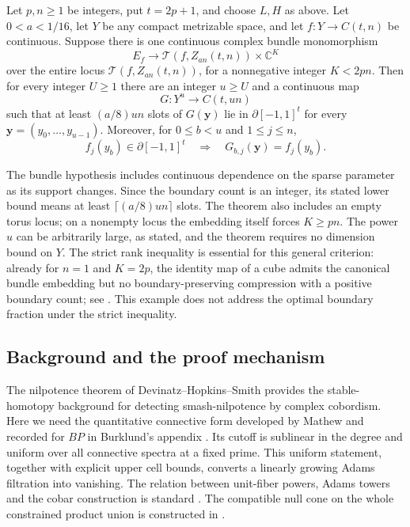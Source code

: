 \begin{theorem}
\label{thm:torus-compression}
Let $p,n\ge1$ be integers, put $t=2p+1$, and choose $L,H$ as above.
Let $0<a<1/16$, let $Y$ be any compact metrizable space, and let
$f:Y\to C(t,n)$ be continuous.  Suppose there is one continuous
complex bundle monomorphism
\[
 E_f\longrightarrow\mathcal T(f,Z_{an}(t,n))\times\mathbb C^K
\]
over the entire locus $\mathcal T(f,Z_{an}(t,n))$, for a nonnegative
integer $K<2pn$.  Then for every integer $U\ge1$ there are an integer
$u\ge U$ and a continuous map
\[
 G:Y^u\longrightarrow C(t,un)
\]
such that at least $(a/8)un$ slots of $G(\mathbf y)$ lie in
$\partial[-1,1]^t$ for every $\mathbf y=(y_0,\ldots,y_{u-1})$.
Moreover, for $0\le b<u$ and $1\le j\le n$,
\[
 f_j(y_b)\in\partial[-1,1]^t
 \quad\Longrightarrow\quad G_{b,j}(\mathbf y)=f_j(y_b).
\]
\end{theorem}

The bundle hypothesis includes continuous dependence on the sparse
parameter as its support changes.  Since the boundary count is an
integer, its stated lower bound means at least
$\lceil(a/8)un\rceil$ slots.  The theorem also includes an empty
torus locus; on a nonempty locus the embedding itself forces $K\ge pn$.
The power $u$ can be arbitrarily large, as stated, and the theorem
requires no dimension bound on $Y$.
The strict rank inequality is essential for this general criterion:
already for $n=1$ and $K=2p$, the identity map of a cube admits the canonical
bundle embedding but no boundary-preserving compression with a positive
boundary count; see .  This example does
not address the optimal boundary fraction under the strict inequality.

\subsection{Background and the proof mechanism}

The nilpotence theorem of Devinatz--Hopkins--Smith
\cite{DevinatzHopkinsSmith1988} provides the stable-homotopy background
for detecting smash-nilpotence by complex cobordism.  Here we need the
quantitative connective form developed by Mathew
\cite[Section~3.4]{Mathew2018} and recorded for $BP$ in Burklund's
appendix \cite[Appendix~B]{BurklundHahnSenger2023}.  Its cutoff is
sublinear in the degree and uniform over all connective spectra at a
fixed prime.  This uniform statement, together with explicit upper
cell bounds, converts a linearly growing Adams filtration into
vanishing.  The relation between unit-fiber powers, Adams towers and
the cobar construction is standard
\cite[Section~2.1, Propositions~2.11 and~2.14]{MathewNaumannNoel2017}.
The compatible null cone on the whole constrained product union is
constructed in .

